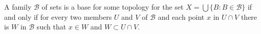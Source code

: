 A family $\mathcal{B}$ of sets is a base for some topology for the set $X = \bigcup \{B: B \in \mathcal{B}\}$ if and only if for every two members $U$ and $V$ of $\mathcal{B}$ and each point $x$ in $U \cap V$ there is $W$ in $\mathcal{B}$ such that $x \in W$ and $W \subset U \cap V$.
